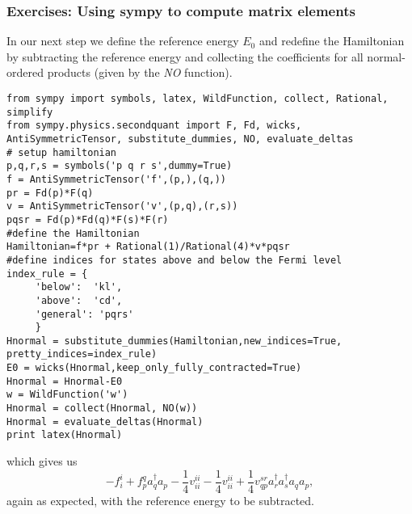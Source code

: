 \documentclass{beamer}
\begin{document}
\begin{frame}
\frametitle{Exercises: Using sympy to compute matrix elements}

\begin{block}{}
In our next step we define the reference energy $E_0$ and redefine the Hamiltonian by subtracting the reference energy and collecting the coefficients for all normal-ordered products (given by the \emph{NO} function).
\begin{verbatim}
from sympy import symbols, latex, WildFunction, collect, Rational, simplify
from sympy.physics.secondquant import F, Fd, wicks, AntiSymmetricTensor, substitute_dummies, NO, evaluate_deltas
# setup hamiltonian
p,q,r,s = symbols('p q r s',dummy=True)
f = AntiSymmetricTensor('f',(p,),(q,))
pr = Fd(p)*F(q)
v = AntiSymmetricTensor('v',(p,q),(r,s))
pqsr = Fd(p)*Fd(q)*F(s)*F(r)
#define the Hamiltonian
Hamiltonian=f*pr + Rational(1)/Rational(4)*v*pqsr
#define indices for states above and below the Fermi level
index_rule = {
     'below':  'kl',
     'above':  'cd',
     'general': 'pqrs'
     }
Hnormal = substitute_dummies(Hamiltonian,new_indices=True, pretty_indices=index_rule)
E0 = wicks(Hnormal,keep_only_fully_contracted=True)
Hnormal = Hnormal-E0
w = WildFunction('w')
Hnormal = collect(Hnormal, NO(w))
Hnormal = evaluate_deltas(Hnormal)
print latex(Hnormal)
\end{verbatim}
which gives us 
\[
- f^{i}_{i} + f^{q}_{p} a^\dagger_{q} a_{p} - \frac{1}{4} v^{ii}_{ii} - \frac{1}{4} v^{ii}_{ii} + \frac{1}{4} v^{sr}_{qp} a^\dagger_{r} a^\dagger_{s} a_{q} a_{p},
\]
again as expected, with the reference energy to be subtracted. 
\end{block}
\end{frame}
\end{document}
